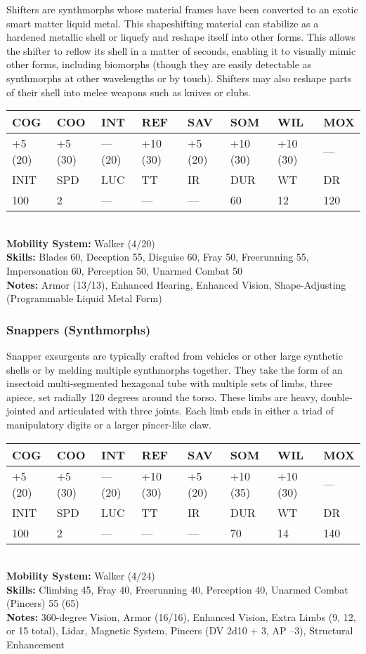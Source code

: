 Shifters are synthmorphs whose material frames have 
been converted to an exotic smart matter liquid metal. 
This shapeshifting material can stabilize as a hardened 
metallic shell or liquefy and reshape itself into other 
forms. This allows the shifter to reflow its shell in a 
matter of seconds, enabling it to visually mimic other 
forms, including biomorphs (though they are easily 
detectable as synthmorphs at other wavelengths or by 
touch). Shifters may also reshape parts of their shell 
into melee weapons such as knives or clubs.
\\
\begin{tabular}{|l|l|l|l|l|l|l|l|}
\hline
COG & COO & INT & REF & SAV & SOM & WIL & MOX \\
\hline
+5 (20) &  +5 (30) &  — (20) &  +10 (30) &  +5 (20) &  +10 (30) &  +10 (30) &  — \\
\hline
INIT & SPD & LUC & TT & IR & DUR & WT & DR \\
\hline
100 & 2 & — & — & — & 60 & 12 & 120 \\
\hline
\end{tabular}
\\
\textbf{Mobility System: }Walker (4/20)
\\
\textbf{Skills:} Blades 60, Deception 55, Disguise 60, Fray 50, Freerunning 55, Impersonation 60, Perception 50, Unarmed Combat 50 
\\
\textbf{Notes: }Armor (13/13), Enhanced Hearing, Enhanced Vision, Shape-Adjusting (Programmable Liquid Metal Form)

\subsubsection{Snappers (Synthmorphs)}

Snapper exsurgents are typically crafted from vehicles 
or other large synthetic shells or by melding multiple 
synthmorphs together. They take the form of an insectoid
multi-segmented hexagonal tube with multiple
sets of limbs, three apiece, set radially 120 degrees 
around the torso. These limbs are heavy, double-jointed
and articulated with three joints. Each limb
ends in either a triad of manipulatory digits or a larger 
pincer-like claw.
\\
\begin{tabular}{|l|l|l|l|l|l|l|l|}
\hline
COG & COO & INT & REF & SAV & SOM & WIL & MOX \\
\hline
+5 (20) &  +5 (30) &  — (20) &  +10 (30) &  +5 (20) &  +10 (35) &  +10 (30) &  — \\
\hline
INIT & SPD & LUC & TT & IR & DUR & WT & DR \\
\hline
100 & 2 & — & — & — & 70 & 14 & 140 \\
\hline
\end{tabular}
\\
\textbf{Mobility System:} Walker (4/24)
\\
\textbf{Skills:} Climbing 45, Fray 40, Freerunning 40, Perception 40, Unarmed Combat (Pincers) 55 (65)
\\
\textbf{Notes: }360-degree Vision, Armor (16/16), Enhanced Vision, Extra Limbs (9, 12, or 15 total), Lidar, Magnetic System, Pincers (DV 2d10 + 3, AP –3), Structural Enhancement 

